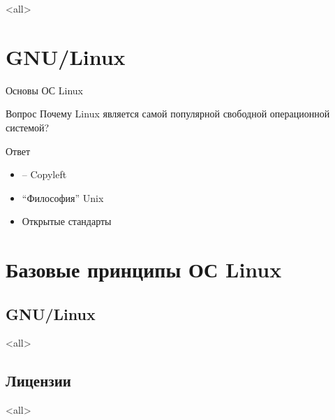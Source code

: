 \mode<all>{}

\section*{GNU/Linux}

\begin{frame}{Основы ОС Linux}

	\begin{block}{Вопрос}
	Почему Linux является самой популярной
	свободной операционной системой?
	\end{block}

	\pause

	\begin{block}{Ответ}
	\begin{itemize}
		\item \textcopyleft -- Copyleft
		\item ``Философия'' Unix
		\item Открытые стандарты
	\end{itemize}
	\end{block}

\end{frame}



\section[Принципы]{Базовые принципы ОС Linux}

\subsection{GNU/Linux}

\mode<all>{}

\subsection{Лицензии}

\mode<all>{}



